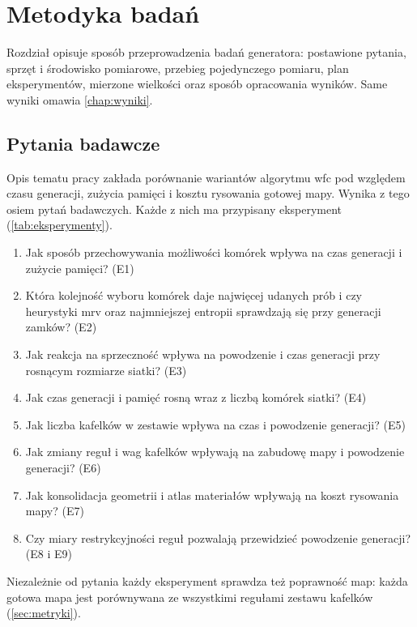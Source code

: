 
\chapter{Metodyka badań}
\label{chap:metodyka}

Rozdział opisuje sposób przeprowadzenia badań generatora: postawione pytania, sprzęt i środowisko pomiarowe, przebieg pojedynczego pomiaru, plan eksperymentów, mierzone wielkości oraz sposób opracowania wyników. Same wyniki omawia \cref{chap:wyniki}.

\section{Pytania badawcze}
\label{sec:pytania}

Opis tematu pracy zakłada porównanie wariantów algorytmu \ac{wfc} pod względem czasu generacji, zużycia pamięci i kosztu rysowania gotowej mapy. Wynika z tego osiem pytań badawczych. Każde z nich ma przypisany eksperyment (\cref{tab:eksperymenty}).

\begin{enumerate}
  \item Jak sposób przechowywania możliwości komórek wpływa na czas generacji i zużycie pamięci? (E1)
  \item Która kolejność wyboru komórek daje najwięcej udanych prób i czy heurystyki \ac{mrv} oraz najmniejszej entropii sprawdzają się przy generacji zamków? (E2)
  \item Jak reakcja na sprzeczność wpływa na powodzenie i czas generacji przy rosnącym rozmiarze siatki? (E3)
  \item Jak czas generacji i pamięć rosną wraz z liczbą komórek siatki? (E4)
  \item Jak liczba kafelków w zestawie wpływa na czas i powodzenie generacji? (E5)
  \item Jak zmiany reguł i wag kafelków wpływają na zabudowę mapy i powodzenie generacji? (E6)
  \item Jak konsolidacja geometrii i atlas materiałów wpływają na koszt rysowania mapy? (E7)
  \item Czy miary restrykcyjności reguł pozwalają przewidzieć powodzenie generacji? (E8 i E9)
\end{enumerate}

Niezależnie od pytania każdy eksperyment sprawdza też poprawność map: każda gotowa mapa jest porównywana ze wszystkimi regułami zestawu kafelków (\cref{sec:metryki}).

